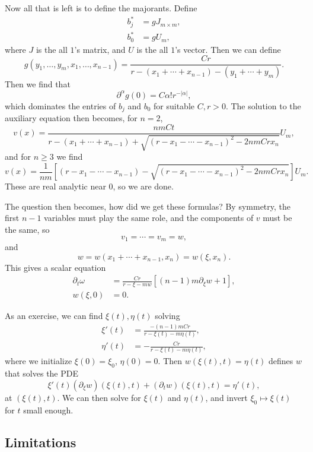 \documentclass[12pt]{article}
\begin{document}
Now all that is left is to define the majorants. Define
\begin{align*}
	b_j^{\ast} &= g J_{m\times m}, \\
	b_0^{\ast} &= g U_{m},
\end{align*}
where $J$ is the all $1$'s matrix, and $U$ is the all $1$'s vector. Then we can define
\[
g(y_1, \ldots, y_m, x_1, \ldots, x_{n-1}) = \frac{Cr}{r - (x_1 +\cdots + x_{n-1}) - (y_1 + \cdots + y_m)}.
\]
Then we find that
\[
\partial^{\alpha} g(0) = C \alpha! r^{-|\alpha|},
\]
which dominates the entries of $b_j$ and $b_0$ for suitable $C, r > 0$. The solution to the auxiliary equation then becomes, for $n = 2$,
\[
	v(x) = \frac{n m C t}{r - (x_1 + \cdots + x_{n-1}) + \sqrt{(r - x_1 - \cdots - x_{n-1})^2 - 2nmCrx_n}} U_m,
\]
and for $n \geq 3$ we find
\[
	v(x) = \frac{1}{nm} \left[ (r - x_1 - \cdots - x_{n-1}) - \sqrt{(r - x_1 - \cdots - x_{n-1})^2 - 2nmCr x_n} \right] U_m.
\]
These are real analytic near $0$, so we are done.

The question then becomes, how did we get these formulas? By symmetry, the first $n-1$ variables must play the same role, and the components of $v$ must be the same, so
\[
v_1 = \cdots = v_m = w,
\]
and
\[
w = w(x_1 + \cdots + x_{n-1}, x_n) = w(\xi, x_n).
\]
This gives a scalar equation
\begin{align*}
	\partial_t \omega &= \frac{Cr}{r - \xi - m w} [(n - 1)m \partial_\xi w + 1], \\
	w(\xi, 0) &= 0.
\end{align*}

As an exercise, we can find $\xi(t), \eta(t)$ solving
\begin{align*}
	\xi'(t) &= \frac{-(n-1)m Cr}{r - \xi(t) - m \eta(t)}, \\
	\eta'(t) &= - \frac{Cr}{r - \xi(t) - m \eta(t)},
\end{align*}
where we initialize $\xi(0) = \xi_0$, $\eta(0) = 0$. Then $w(\xi(t), t) = \eta(t)$ defines $w$ that solves the PDE
\[
\xi'(t) (\partial_\xi w)(\xi(t), t) + (\partial_t w)(\xi(t), t) = \eta'(t),
\]
at $(\xi(t), t)$. We can then solve for $\xi(t)$ and $\eta(t)$, and invert $\xi_0 \mapsto \xi(t)$ for $t$ small enough.

%

\subsection{Limitations}%
\label{sub:lims}
\end{document}
